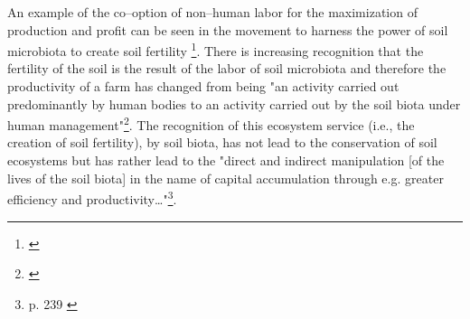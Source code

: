 \documentclass{article}
\begin{document}
An example of the co--option of non--human labor for the maximization of production and profit can be seen in the movement to harness the power of soil microbiota to create soil fertility \footnote{\cite{krz_nonhuman_2020}}. There is increasing recognition that the fertility of the soil is the result of the labor of soil microbiota and therefore the productivity of a farm has changed from being "an activity carried out predominantly by human bodies to an activity carried out by the soil biota under human management"\footnote{\cite{krz_nonhuman_2020}}. The recognition of this ecosystem service (i.e., the creation of soil fertility), by soil biota, has not lead to the conservation of soil ecosystems but has rather lead to the "direct and indirect manipulation [of the lives of the soil biota] in the name of capital accumulation through e.g. greater efficiency and productivity\ldots"\footnote{p. 239 \cite{krz_nonhuman_2020}}. 

{}

\end{document}
